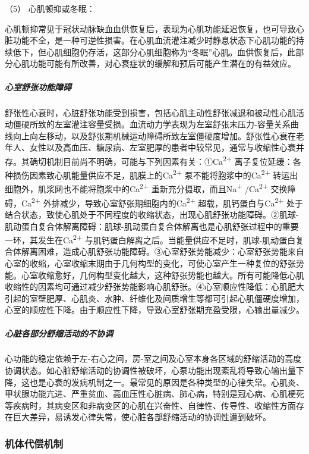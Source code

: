 \hypertarget{text00072.htmlux5cux23CHP3-3-1-2-1-1-5}{}
（5） 心肌顿抑或冬眠：

心肌顿抑常见于冠状动脉缺血血供恢复后，表现为心肌功能延迟恢复，也可导致心脏功能不全，是一种可逆性损害。在心肌血流灌注减少时静息状态下心肌功能的持续低下，但心肌细胞仍存活，这部分心肌细胞称为“冬眠”心肌。血供恢复后，此部分心肌功能可能有所改善，对心衰症状的缓解和预后可能产生潜在的有益效应。

\subparagraph{心室舒张功能障碍}

舒张性心衰时，心脏舒张功能受到损害，包括心肌主动性舒张减退和被动性心肌活动僵硬所致的左室灌注容量受损。血流动力学表现为左室舒张末压力-容量关系曲线向上向左移动，以及舒张期机械运动障碍所致左室僵硬度增加。舒张性心衰在老年人、女性以及高血压、糖尿病、左室肥厚的患者中较常见，通常与收缩性心衰并存。其确切机制目前尚不明确，可能与下列因素有关：①Ca\textsuperscript{2+}
离子复位延缓：各种损伤因素致心肌能量供应不足，肌膜上的Ca\textsuperscript{2+}
泵不能将胞浆中的Ca\textsuperscript{2+}
转运出细胞外，肌浆网也不能将胞浆中的Ca\textsuperscript{2+}
重新充分摄取，而且Na\textsuperscript{+} /Ca\textsuperscript{2+}
交换障碍，Ca\textsuperscript{2+}
外排减少，导致心室舒张期细胞内的Ca\textsuperscript{2+}
超载，肌钙蛋白与Ca\textsuperscript{2+}
处于结合状态，致使心肌处于不同程度的收缩状态，出现心肌舒张功能障碍。②肌球-肌动蛋白复合体解离障碍：肌球-肌动蛋白复合体解离也是心肌舒张过程中的重要一环，其发生在Ca\textsuperscript{2+}
与肌钙蛋白解离之后。当能量供应不足时，肌球-肌动蛋白复合体解离困难，造成心肌舒张功能障碍。③心室舒张势能减少：心室舒张势能来自心室的收缩，心室收缩末期由于几何构型的变化，可使心室产生一种复位的舒张势能。心室收缩愈好，几何构型变化越大，这种舒张势能也越大。所有可能降低心肌收缩性的因素均可通过减少舒张势能影响心肌舒张。④心室顺应性降低：心肌肥大引起的室壁肥厚、心肌炎、水肿、纤维化及间质增生等都可引起心肌僵硬度增加，心室的顺应性下降。由于顺应性下降，导致心室舒张期充盈受限，心输出量减少。

\subparagraph{心脏各部分舒缩活动的不协调}

心功能的稳定依赖于左-右心之间，房-室之间及心室本身各区域的舒缩活动的高度协调状态。如心脏舒缩活动的协调性被破坏，心泵功能出现紊乱将导致心输出量下降，这也是心衰的发病机制之一。最常见的原因是各种类型的心律失常。心肌炎、甲状腺功能亢进、严重贫血、高血压性心脏病、肺心病，特别是冠心病、心肌梗死等疾病时，其病变区和非病变区的心肌在兴奋性、自律性、传导性、收缩性方面存在巨大差异，易诱发心律失常，使心脏各部舒缩活动的协调性遭到破坏。

\subsubsection{机体代偿机制}

